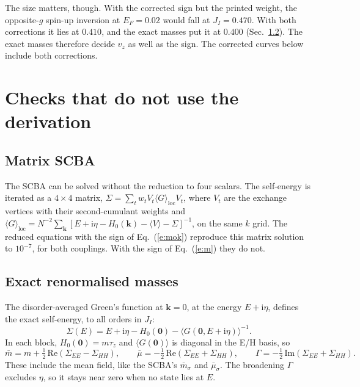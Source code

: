 \documentclass[11pt,a4paper]{article}
\newcommand{\I}{\mathrm{i}}
\begin{document}
The size matters, though. With the corrected sign but the printed weight, the opposite-$g$
spin-up inversion at $E_F=0.02$ would fall at $J_I=0.470$. With both corrections it lies at
$0.410$, and the exact masses put it at $0.400$ (Sec.~\ref{s:exact}). The exact masses therefore
decide $v_z$ as well as the sign. The corrected curves below include both corrections.

\section{Checks that do not use the derivation}\label{s:checks}

\subsection{Matrix SCBA}

The SCBA can be solved without the reduction to four scalars. The self-energy is iterated as a
$4\times4$ matrix, $\Sigma = \sum_t w_t V_t\langle G\rangle_{\mathrm{loc}}V_t$, where $V_t$ are the
exchange vertices with their second-cumulant weights and
$\langle G\rangle_{\mathrm{loc}} = N^{-2}\sum_{\bm k}[E+\I\eta-H_0(\bm k)-\langle V\rangle-\Sigma]^{-1}$, on the same
$k$ grid. The reduced equations with the sign of Eq.~(\ref{e:mok}) reproduce this matrix
solution to $10^{-7}$, for both couplings. With the sign of Eq.~(\ref{e:m}) they do not.

\subsection{Exact renormalised masses}\label{s:exact}

The disorder-averaged Green's function at $\bm k=0$, at the energy $E+\I\eta$, defines the exact
self-energy, to all orders in $J_I$:
\begin{equation}
\Sigma(E) = E + \I\eta - H_0(\bm 0) - \langle G(\bm 0, E+\I\eta)\rangle^{-1}.
\end{equation}
In each block, $H_0(\bm 0)=m\tau_z$ and $\langle G(\bm 0)\rangle$ is diagonal in the E/H basis, so
\begin{equation}
\bar m = m + \tfrac12\,\mathrm{Re}(\Sigma_{EE}-\Sigma_{HH}),\qquad
\bar\mu = -\tfrac12\,\mathrm{Re}(\Sigma_{EE}+\Sigma_{HH}),\qquad
\Gamma = -\tfrac12\,\mathrm{Im}(\Sigma_{EE}+\Sigma_{HH}).
\end{equation}
These include the mean field, like the SCBA's $\bar m_\sigma$ and $\bar\mu_\sigma$.
The broadening $\Gamma$ excludes $\eta$, so it stays near zero when no state lies at $E$.
\end{document}

